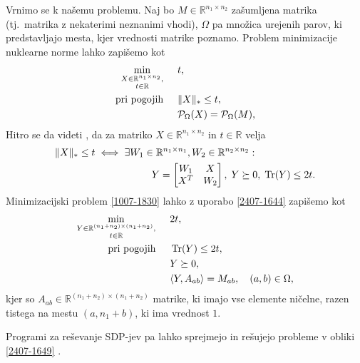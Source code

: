 Vrnimo se k našemu problemu. Naj bo $M \in \mathbb{R}^{n_1 \times n_2}$ zašumljena matrika (tj.\ matrika z nekaterimi neznanimi vhodi), $\Omega$ pa množica urejenih parov, ki predstavljajo mesta, kjer vrednosti matrike poznamo.
Problem minimizacije nuklearne norme lahko zapišemo kot
\begin{align}
\label{1007-1830}
\begin{split}
    \min_{\substack{X\in \mathbb R^{n_1\times n_2},\\ t\in \mathbb R}} \hspace{0.5cm}        & t,                                               \\
    \text{pri pogojih} \hspace{0.5cm} & \lVert X\rVert_* \leq t,  \\
                                      & \mathcal{P}_\Omega(X) = \mathcal{P}_\Omega(M),
\end{split}
\end{align}
Hitro se da videti \cite{NNM-PHD}, da za matriko $X \in \mathbb{R}^{n_1 \times n_2}$ in $t \in \mathbb{R}$
velja 
\begin{align}
\label{2407-1644}
\begin{split}
\lVert X\rVert_* \leq t &\iff \exists W_1\in \mathbb{R}^{n_1 \times n_1}, W_2 \in \mathbb{R}^{n_2 \times n_2}:\\
&\hspace{2cm}
Y = \begin{bmatrix}
               W_1 & X                     \\
               X^T & W_2 
           \end{bmatrix},\;       Y \succeq 0,\; \operatorname{Tr}(Y) \leq 2t.
\end{split}
\end{align}
Minimizacijski problem \eqref{1007-1830} lahko z uporabo \eqref{2407-1644} zapišemo kot
\begin{align}
\label{2407-1649}
\begin{split}
    \min_{\substack{Y\in \mathbb R^{(n_1+n_2)\times (n_1+n_2)},\\ t\in \mathbb R}}     \hspace{0.5cm} & 2t,                        \\
    \text{pri pogojih} \hspace{0.5cm} & \operatorname{Tr}(Y) \leq 2t,           \\
                                  & Y \succeq 0,              \\
                                  & \langle Y, A_{ab} \rangle = M_{ab},\quad (a,b)\in \Omega,
\end{split}
\end{align}
kjer so $A_{ab} \in \mathbb{R}^{(n_1 + n_2) \times (n_1 + n_2)}$ matrike, ki imajo vse elemente ničelne, razen tistega na mestu $(a, n_1 + b)$, ki ima vrednost $1$.
\iffalse
Ker velja
\[
    \trOp{A}{B} = \sum_{i}^{n_1} \sum_{j}^{n_2} a_{ij}b_{ij}
\] je lahko videti, da je tak pogoj smiselen. 
\fi
Programi za reševanje SDP-jev pa lahko sprejmejo in rešujejo probleme v obliki \eqref{2407-1649}
\cite{Survey-NKS19}.


